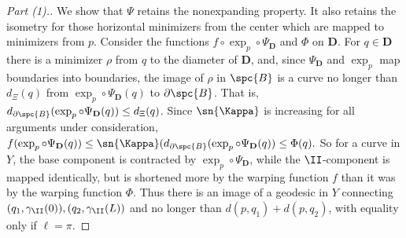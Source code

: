 \begin{proof}[Part (1).]
We show that $\Psi$ retains the nonexpanding property. It also retains the
isometry for those horizontal minimizers from the center which are
mapped to minimizers from $p$. Consider the functions $f\circ \exp_p
\circ \Psi_\mathbf{D}$ and $\Phi$ on $\mathbf{D}$. For $q \in
\mathbf{D}$ there is a minimizer $\rho$ from $q$ to the diameter of
$\mathbf{D}$, and, since $\Psi_\mathbf{D}$ and $\exp_p$ map boundaries
into boundaries, the image of $\rho$ in $\spc{B}$ is a curve no longer
than $d_\Xi(q)$ from $\exp_p\circ\Psi_\mathbf{D}(q)$ to $\partial \spc{B}$. That is,
$d_{\partial \spc{B}}(\exp_p\circ\Psi_\mathbf{D}(q)) \le d_\Xi(q)$.  Since
$\sn{\Kappa}$ is increasing
for all arguments under consideration,
$f(\exp_p\circ\Psi_\mathbf{D}(q)) \le \sn{\Kappa}(d_{\partial
\spc{B}}(\exp_p\circ\Psi_\mathbf{D}(q))\le\Phi(q).$
So for a curve in $Y$, the base component is contracted by $\exp_p
\circ\Psi_\mathbf{D}$, while the $\II$-component is mapped identically,
but
is shortened more by the warping function $f$ than it was by the
warping function $\Phi$.  Thus there is an image of a geodesic in $Y$
connecting
$(q_1,\gamma_\II(0)), (q_2,\gamma_\II(L))$ and no longer than $d(p,q_1) +
d(p,q_2)$,
with equality only if $\ell = \pi$.
\end{proof}

